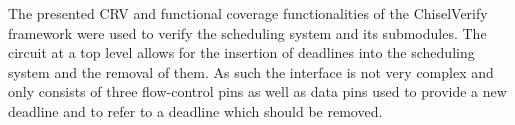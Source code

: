 \documentclass[conference]{IEEEtran}
\newcommand{\martin}[1]{{\color{blue} Martin: #1}}
\begin{document}










The presented CRV and functional coverage functionalities of the ChiselVerify framework were used to verify the scheduling system and its submodules. 
The circuit at a top level allows for the insertion of deadlines into the scheduling system and the removal of them. As such the interface is not very complex and only consists of three flow-control pins as well as data pins used to provide a new deadline and to refer to a deadline which should be removed. 
\end{document}
